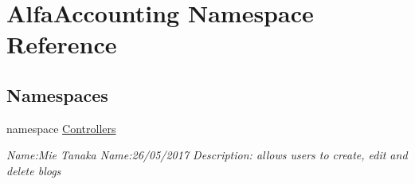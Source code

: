 \hypertarget{namespace_alfa_accounting}{}\section{Alfa\+Accounting Namespace Reference}
\label{namespace_alfa_accounting}
\subsection*{Namespaces}
\begin{DoxyCompactItemize}
\item 
namespace \hyperlink{namespace_alfa_accounting_1_1_controllers}{Controllers}
\begin{DoxyCompactList}\small\item\em Name\+:Mie Tanaka Name\+:26/05/2017 Description\+: allows users to create, edit and delete blogs \end{DoxyCompactList}\end{DoxyCompactItemize}
